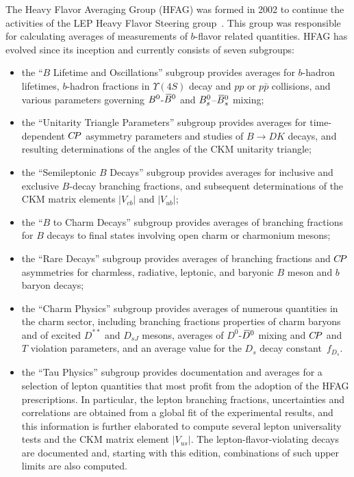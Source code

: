 The Heavy Flavor Averaging Group (HFAG) was formed in 2002 to 
continue the activities of the LEP Heavy Flavor Steering 
group~\cite{Abbaneo:2000ej_mod,*Abbaneo:2001bv_mod_cont}. 
This group was responsible for calculating averages of 
measurements of $b$-flavor related quantities. HFAG has evolved 
since its inception and currently consists of seven subgroups:
% 
\begin{itemize}
\item the ``$B$ Lifetime and Oscillations'' subgroup provides 
averages for $b$-hadron lifetimes, $b$-hadron fractions in 
$\Upsilon(4S)$ decay and $pp$ or $p\bar{p}$ collisions, and various 
parameters governing $B^0$-$\kern 0.18em\overline{\kern -0.18em B}{}^0$ and $B^0_s$--$\kern 0.18em\overline{\kern -0.18em B}{}_s^0$ mixing;

\item the ``Unitarity Triangle Parameters'' subgroup provides
averages for time-dependent $C\!P$ asymmetry parameters and studies of $B \to DK$ decays, and 
resulting determinations of the angles of the CKM unitarity triangle;

\item the ``Semileptonic $B$ Decays'' subgroup provides averages
for inclusive and exclusive $B$-decay branching fractions, and
subsequent determinations of the CKM matrix elements 
$|V_{cb}|$ and $|V_{ub}|$;

\item the ``$B$ to Charm Decays'' subgroup provides averages of 
branching fractions for $B$ decays to final states involving open 
charm or charmonium mesons;

\item the ``Rare Decays'' subgroup provides averages of branching 
fractions and $C\!P$ asymmetries for charmless, radiative, 
leptonic, and baryonic $B$ meson and $b$ baryon decays;

\item the ``Charm Physics'' subgroup provides averages of numerous quantities in the charm sector, including branching fractions 
properties of charm baryons and of excited $D^{**}$ and $D^{}_{sJ}$ mesons, 
averages of $D^0$-$\kern 0.2em\overline{\kern -0.2em D}{}^0$ mixing and $C\!P$ and $T$ violation parameters, 
and an average value for the $D^{}_s$ decay constant~$f^{}_{D_s}$.

\item the ``Tau Physics'' subgroup provides documentation and
averages for a selection of \mtau lepton quantities that most profit
from the adoption of the HFAG prescriptions. In particular, the \mtau
lepton branching fractions, uncertainties and correlations are
obtained from a global fit of the experimental results, and this
information is further elaborated to compute several lepton
universality tests and the CKM matrix element $|V_{us}|$. The \mtau
lepton-flavor-violating decays are documented and, starting with this
edition, combinations of such upper limits are also computed.
\end{itemize}

